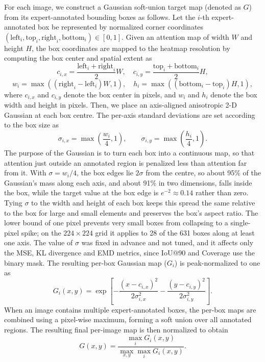\documentclass[lineno,pdflatex,sn-mathphys-num]{sn-jnl}%
\theoremstyle{thmstyleone}%
\theoremstyle{thmstyletwo}%
\theoremstyle{thmstylethree}%
\begin{document}
For each image, we construct a Gaussian soft-union target map (denoted as $G$) from its expert-annotated bounding boxes as follows. Let the $i$-th expert-annotated box be represented by normalized corner coordinates $(\mathrm{left}_i, \mathrm{top}_i, \mathrm{right}_i, \mathrm{bottom}_i) \in [0, 1]$. Given an attention map of width $W$ and height $H$, the box coordinates are mapped to the heatmap resolution by computing the box center and spatial extent as
\begin{equation}
c_{i,x} = \frac{\mathrm{left}_i + \mathrm{right}_i}{2}W,
\quad
c_{i,y} = \frac{\mathrm{top}_i + \mathrm{bottom}_i}{2}H,
\end{equation}
\begin{equation}
w_i = \max\left(\left(\mathrm{right}_i - \mathrm{left}_i\right)W, 1\right),
\quad
h_i = \max\left(\left(\mathrm{bottom}_i - \mathrm{top}_i\right)H, 1\right),
\end{equation}
where $c_{i,x}$ and $c_{i,y}$ denote the box center in pixels, and $w_i$ and $h_i$ denote the box width and height in pixels. Then, we place an axis-aligned anisotropic 2-D Gaussian at each
box centre. The per-axis standard deviations are set according to the box size as
\begin{equation}
\sigma_{i,x} = \max\left(\frac{w_i}{4}, 1\right),
\qquad
\sigma_{i,y} = \max\left(\frac{h_i}{4}, 1\right).
\end{equation}
The purpose of the Gaussian is to turn each box into a continuous map, so that attention just outside an annotated region is penalized less than attention far from it. With $\sigma = w_i/4$, the box edges lie $2\sigma$ from the centre, so about 95\% of the Gaussian's mass along each axis, and about 91\% in two dimensions, falls inside the box, while the target value at the box edge is $e^{-2} \approx 0.14$ rather than zero. Tying $\sigma$ to the width and height of each box keeps this spread the same relative to the box for large and small elements and preserves the box's aspect ratio. The lower bound of one pixel prevents very small boxes from collapsing to a single-pixel spike; on the $224 \times 224$ grid it applies to 28 of the 631 boxes along at least one axis. The value of $\sigma$ was fixed in advance and not tuned, and it affects only the MSE, KL divergence and EMD metrics, since IoU@90 and Coverage use the binary mask.
The resulting per-box Gaussian map ($G_i$) is peak-normalized to one as
\begin{equation}
G_i(x, y) = \exp\left[-\frac{(x - c_{i,x})^{2}}{2\sigma_{i,x}^{2}}-\frac{(y - c_{i,y})^{2}}{2\sigma_{i,y}^{2}}\right].
\end{equation}
When an image contains multiple expert-annotated boxes, the per-box maps are combined using a pixel-wise maximum, forming a soft union over all annotated regions. The resulting final per-image map is then normalized to obtain
\begin{equation}
G(x, y) = \frac{\max_{i} G_i(x, y)}{\max_{x, y} \max_{i} G_i(x, y)}.
\end{equation}
\end{document}
